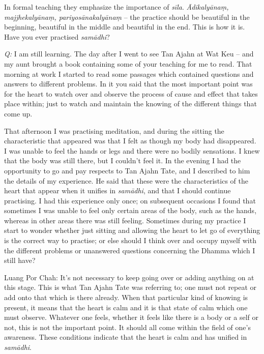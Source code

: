 In formal teaching they emphasize the importance of \emph{sīla}. 
\emph{Ādikalyānaṃ, majjhekalyānaṃ, pariyosānakalyānaṃ} -- the practice should
be beautiful in the beginning, beautiful in the middle and beautiful in
the end. This is how it is. Have you ever practised \emph{samādhi}? 

\emph{Q:} I am still learning. The day after I went to see Tan Ajahn at Wat
Keu -- and my aunt brought a book containing some of your teaching for me
to read. That morning at work I started to read some passages which
contained questions and answers to different problems. In it you said
that the most important point was for the heart to watch over and
observe the process of cause and effect that takes place within; just to
watch and maintain the knowing of the different things that come up. 

That afternoon I was practising meditation, and during the sitting the
characteristic that appeared was that I felt as though my body had
disappeared. I was unable to feel the hands or legs and there were no
bodily sensations. I knew that the body was still there, but I couldn't
feel it. In the evening I had the opportunity to go and pay respects to
Tan Ajahn Tate, and I described to him the details of my experience. He
said that these were the characteristics of the heart that appear when
it unifies in \emph{samādhi}, and that I should continue practising. I
had this experience only once; on subsequent occasions I found that
sometimes I was unable to feel only certain areas of the body, such as
the hands, whereas in other areas there was still feeling. Sometimes
during my practice I start to wonder whether just sitting and allowing
the heart to let go of everything is the correct way to practise; or
else should I think over and occupy myself with the different problems
or unanswered questions concerning the Dhamma which I still have? 

Luang Por Chah: It's not necessary to keep going over or adding anything
on at this stage. This is what Tan Ajahn Tate was referring to; one must
not repeat or add onto that which is there already. When that particular
kind of knowing is present, it means that the heart is calm and it is
that state of calm which one must observe. Whatever one feels, whether
it feels like there is a body or a self or not, this is not the
important point. It should all come within the field of one's awareness. 
These conditions indicate that the heart is calm and has unified in
\emph{samādhi}. 

